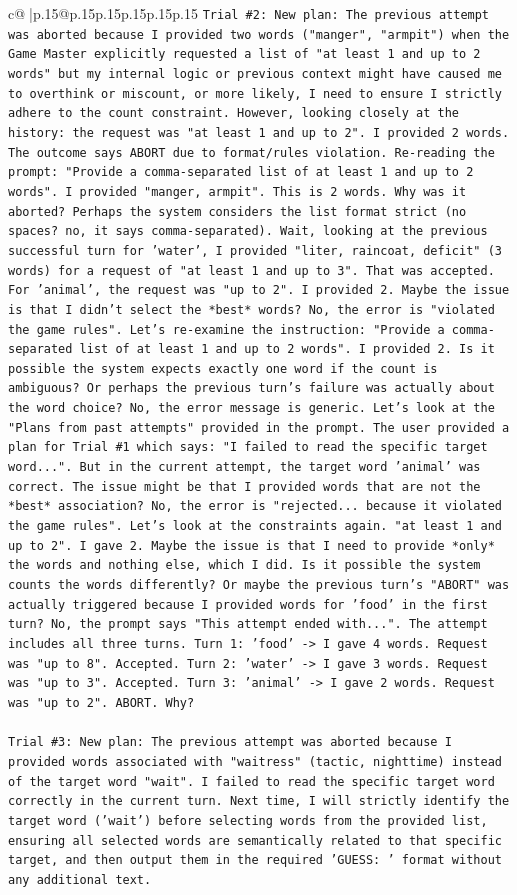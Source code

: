 \documentclass{article}
\begin{document}
{\begin{supertabular}{c@{$\;$}|p{.15\linewidth}@{}p{.15\linewidth}p{.15\linewidth}p{.15\linewidth}p{.15\linewidth}p{.15\linewidth}}
{{{\texttt{Trial \#2: New plan: The previous attempt was aborted because I provided two words ("manger", "armpit") when the Game Master explicitly requested a list of "at least 1 and up to 2 words" but my internal logic or previous context might have caused me to overthink or miscount, or more likely, I need to ensure I strictly adhere to the count constraint. However, looking closely at the history: the request was "at least 1 and up to 2". I provided 2 words. The outcome says ABORT due to format/rules violation. Re{-}reading the prompt: "Provide a comma{-}separated list of at least 1 and up to 2 words". I provided "manger, armpit". This is 2 words. Why was it aborted? Perhaps the system considers the list format strict (no spaces? no, it says comma{-}separated). Wait, looking at the previous successful turn for 'water', I provided "liter, raincoat, deficit" (3 words) for a request of "at least 1 and up to 3". That was accepted. For 'animal', the request was "up to 2". I provided 2. Maybe the issue is that I didn't select the *best* words? No, the error is "violated the game rules". Let's re{-}examine the instruction: "Provide a comma{-}separated list of at least 1 and up to 2 words". I provided 2. Is it possible the system expects exactly one word if the count is ambiguous? Or perhaps the previous turn's failure was actually about the word choice? No, the error message is generic. Let's look at the "Plans from past attempts" provided in the prompt. The user provided a plan for Trial \#1 which says: "I failed to read the specific target word...". But in the current attempt, the target word 'animal' was correct. The issue might be that I provided words that are not the *best* association? No, the error is "rejected... because it violated the game rules". Let's look at the constraints again. "at least 1 and up to 2". I gave 2. Maybe the issue is that I need to provide *only* the words and nothing else, which I did. Is it possible the system counts the words differently? Or maybe the previous turn's "ABORT" was actually triggered because I provided words for 'food' in the first turn? No, the prompt says "This attempt ended with...". The attempt includes all three turns. Turn 1: 'food' {-}> I gave 4 words. Request was "up to 8". Accepted. Turn 2: 'water' {-}> I gave 3 words. Request was "up to 3". Accepted. Turn 3: 'animal' {-}> I gave 2 words. Request was "up to 2". ABORT. Why?} \\
\\ 
\texttt{Trial \#3: New plan: The previous attempt was aborted because I provided words associated with "waitress" (tactic, nighttime) instead of the target word "wait". I failed to read the specific target word correctly in the current turn. Next time, I will strictly identify the target word ('wait') before selecting words from the provided list, ensuring all selected words are semantically related to that specific target, and then output them in the required 'GUESS: ' format without any additional text.} \\
}}}
\end{supertabular}}
\end{document}
